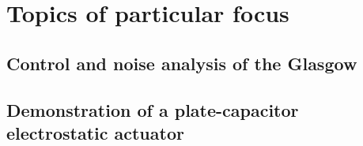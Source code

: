 % 
% 

\section{Topics of particular focus}

\subsection{Control and noise analysis of the Glasgow \SSM{}}

\subsection{Demonstration of a plate-capacitor electrostatic actuator}
